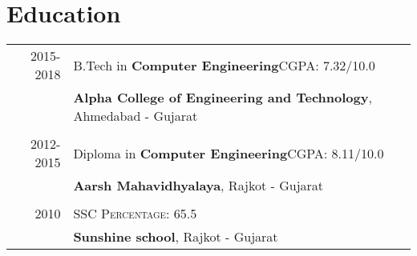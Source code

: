 \documentclass[a4paper,10pt]{extarticle} %
\begin{document}
	
	
	
	
	\section{\textcolor{primary}{Education}}
	\vspace{0.2cm}
	\begin{tabular}{r|p{17.5cm}}
		
		2015-2018 & B.Tech in \textbf{Computer Engineering}\hfill\textsc{CGPA}: 7.32/10.0\\
		\textsc{}&\textbf{Alpha College of Engineering and Technology}, Ahmedabad - Gujarat\\
		
		\multicolumn{2}{c}{} \\
		
		2012-2015 & Diploma in \textbf{Computer Engineering}\hfill\textsc{CGPA}: 8.11/10.0\\
		\textsc{}&\textbf{Aarsh Mahavidhyalaya}, Rajkot - Gujarat\\		


		\multicolumn{2}{c}{} \\

		2010 & SSC \textbf{}\hfill\textsc{Percentage}: 65.5\\
		\textsc{}&\textbf{Sunshine school}, Rajkot - Gujarat\\			
	\end{tabular}
	
	\vspace{0.2cm}
	
	
\end{document}
